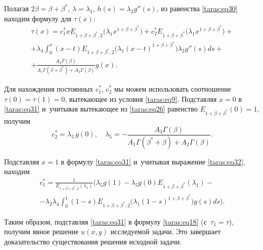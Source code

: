 Полагая $ 2 \beta = \beta+\beta^{*}$, $ \lambda = \lambda_{1}$, $h(s)=\lambda_{2}g''(s)$, из равенства \eqref{taras:eq30} находим формулу для $ \tau(x)$:
\begin{multline}
\label{taras:eq31}
\tau (x) = c_{1}^{*} x E_{  1+\beta+\beta^{*},2} 
\bigl( \lambda_{1} x^{ 1+\beta+\beta^{*}} \bigr) + c_{2}^{*} E_{ 1+\beta+\beta^{*}} 
\bigl( \lambda_{1} x^{ 1+\beta+\beta^{*}} \bigr) + 
\\
+ \lambda_{4} \int _{0}^{x} (x-t) E_{ 1+\beta+\beta^{*}, 2} 
\bigl( \lambda_{1} (x-t)^{ 1+\beta+\beta^{*}} \bigr)  \lambda_{2} g''(s)ds  +
\\
+ \frac{A_{3} \Gamma(\beta) }{A_{1}\Gamma(\beta+\beta^{*})+A_{2}\Gamma(\beta)} g(x).
\end{multline}

Для нахождения постоянных  $c_{1}^{*}$, $c_{2}^{*}$ мы можем использовать соотношение $\tau(0)=\tau(1)=0$, вытекающее из условия \eqref{taras:eq9}. 
Подставляя $x=0$ в \eqref{taras:eq31} и~учитывая вытекающее из \eqref{taras:eq26} равенство $E_{  1+\beta+\beta^{*}}(0)=1$, получим 
\begin{equation}
\label{taras:eq32}
c_{2}^{*}=\lambda_{5}\,g(0), \quad \lambda_{5}=
- \frac{A_{3}\Gamma(\beta)}{A_{1}\Gamma(\beta^{*}+\beta)+A_{2} \Gamma(\beta)} .
\end{equation}

Подставляя $x=1$ в формулу \eqref{taras:eq31} и~учитывая выражение \eqref{taras:eq32}, находим
\begin{multline}
\label{taras:eq33}
c_{1}^{*}= \frac{1}{ E_{  1+ \beta+\beta^{*},  2} \left( \lambda_{1} \right)} 
\biggl( \lambda_{5} g (1)- \lambda_{5} g (0) E_{  1+ \beta+\beta^{*}} \left( \lambda_{1} \right) -   
\\
- \lambda_{2} \lambda_{4} \int _{0}^{1} (1-s) E_{ 1+\beta+\beta^{*},2} \bigl( \lambda_{1} (1-s)^{1+\beta+\beta^{*}} \bigr)   g(s)ds \biggr).
\end{multline}

Таким образом, подставляя \eqref{taras:eq31} в формулу \eqref{taras:eq18} (с~$\tau_{1}=\tau$), получим явное решение $u(x,y)$ исследуемой задачи. 
Это завершает доказательство существования решения исходной задачи.



